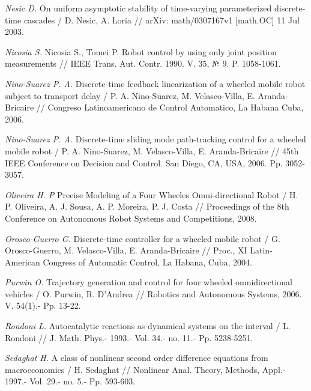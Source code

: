 \begin{thebibliography}{10}
	{\it Nesic D.} On uniform asymptotic stability of time-varying parameterized discrete-time cascades / D. Nesic, A. Loria // arXiv: math/0307167v1 [math.OC] 11 Jul 2003.
	
	{\it Nicosia S.} Nicosia S., Tomei P. Robot control by using only joint position measurements // IEEE Trans. Aut. Contr. 1990. V. 35, № 9. P. 1058-1061.
	
	{\it Nino-Suarez P. A.} Discrete-time feedback linearization of a wheeled mobile robot subject to transport delay / P. A.  Nino-Suarez, M. Velasco-Villa, E. Aranda-Bricaire // Congreso Latinoamericano de Control Automatico, La Habana Cuba, 2006.
	
	{\it Nino-Suarez P. A.} Discrete-time sliding mode path-tracking control for a wheeled mobile robot / P. A.  Nino-Suarez, M. Velasco-Villa, E. Aranda-Bricaire // 45th IEEE Conference on Decision and Control. San Diego, CA, USA, 2006. Pp. 3052-3057.
	
	{\it Oliveira H. P} Precise Modeling of a Four Wheeles Omni-directional Robot / H. P. Oliveira, A. J. Sousa, A. P. Moreira, P. J. Costa // Proceedings of the 8th Conference on Autonomous Robot Systems and Competitions, 2008.
	
	{\it Orosco-Guerro G.} Discrete-time controller for a wheeled mobile robot / G. Orosco-Guerro, M. Velasco-Villa, E. Aranda-Bricaire // Proc., XI Latin-American Congress of Automatic Control, La Habana, Cuba, 2004.
	
	
	{\it Purwin O.} Trajectory generation and control for four wheeled omnidirectional vehicles / O. Purwin, R. D'Andrea // Robotics and Autonomous Systems, 2006. V. 54(1).- Pp. 13-22.
	
	{\it Rondoni L.} Autocatalytic reactions as dynamical systems on the interval / L. Rondoni // J. Math. Phys.- 1993.- Vol. 34.- no. 11.- Pp. 5238-5251.
	
	{\it Sedaghat H.} A class of nonlinear second order difference equations from macroeconomics / H. Sedaghat // Nonlinear Anal. Theory, Methods, Appl.- 1997.- Vol. 29.- no. 5.- Pp. 593-603.
	

\end{thebibliography}
